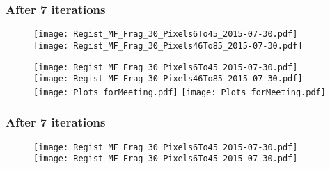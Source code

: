 \documentclass[10pt,dvipsnames,table]{beamer}
\begin{document}
\begin{frame}
\frametitle{After 7 iterations}
\begin{figure}
\texttt{[image: Regist\_MF\_Frag\_30\_Pixels6To45\_2015-07-30.pdf]}
\texttt{[image: Regist\_MF\_Frag\_30\_Pixels46To85\_2015-07-30.pdf]} \\
\end{figure}
\end{frame}

\begin{frame}
\begin{figure}
\texttt{[image: Regist\_MF\_Frag\_30\_Pixels6To45\_2015-07-30.pdf]}
\texttt{[image: Regist\_MF\_Frag\_30\_Pixels46To85\_2015-07-30.pdf]} \\
\texttt{[image: Plots\_forMeeting.pdf]}
\texttt{[image: Plots\_forMeeting.pdf]}
\end{figure}
\end{frame}

\begin{frame}
\frametitle{After 7 iterations}
\begin{figure}
\texttt{[image: Regist\_MF\_Frag\_30\_Pixels6To45\_2015-07-30.pdf]}
\texttt{[image: Regist\_MF\_Frag\_30\_Pixels6To45\_2015-07-30.pdf]}
\end{figure}
\end{frame}
\end{document}
